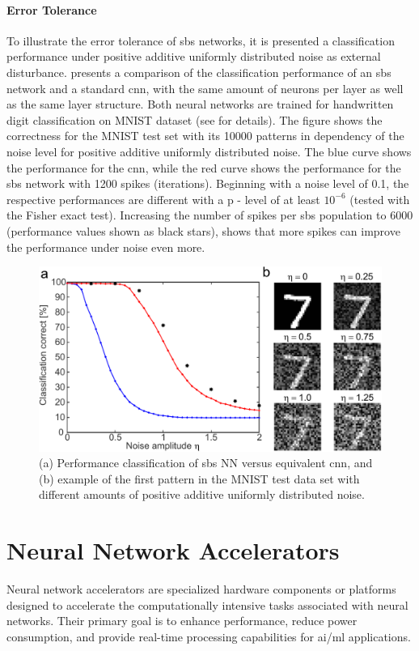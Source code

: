 \paragraph{Error Tolerance}

To illustrate the error tolerance of \gls{sbs} networks, it is presented a classification performance under positive additive uniformly distributed noise as external disturbance.  presents a comparison of the classification performance of an \gls{sbs} network and a standard \gls{cnn}, with the same amount of
neurons per layer as well as the same layer structure. Both neural networks are trained for handwritten digit classification on MNIST dataset \cite{lecun1998mnist} (see \cite{rotermund2019Backpropagation} for details). The figure shows the correctness for the MNIST test set with its \num[group-separator={,}]{10000} patterns in dependency of the noise level for positive additive
uniformly distributed noise. The blue curve shows the performance for
the \gls{cnn}, while the red curve shows the performance for
the \gls{sbs} network with \num[group-separator={,}]{1200} spikes (iterations). Beginning
with a noise level of 0.1, the respective performances are different
with a p - level of at least $10^{-6}$ (tested with the Fisher exact
test). Increasing the number of spikes per \gls{sbs} population to \num[group-separator={,}]{6000}
(performance values shown as black stars), shows that more spikes can
improve the performance under noise even more.

\begin{figure}
	\centering
	\includegraphics[width=0.5\columnwidth]{./chapters/sbs_accelerator/figures/sbs_robustnes.pdf}
	\caption{(a) Performance classification of \gls{sbs} NN versus equivalent \gls{cnn}, and (b) example of the first pattern in the MNIST test data set with different amounts of positive additive uniformly distributed noise.}
	\label{fig:robustnes_sbs}
\end{figure}


\section{Neural Network Accelerators}
Neural network accelerators are specialized hardware components or platforms designed to accelerate the computationally intensive tasks associated with neural networks. Their primary goal is to enhance performance, reduce power consumption, and provide real-time processing capabilities for \gls{ai}/\gls{ml} applications.

